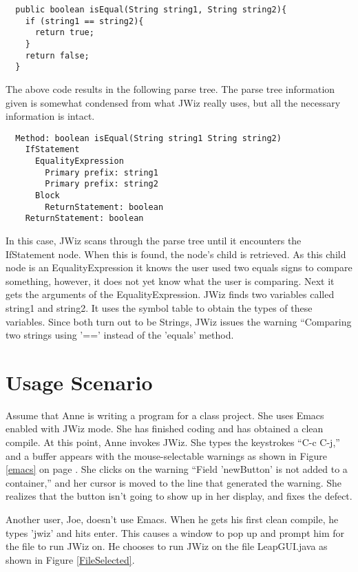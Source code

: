\begin{verbatim}
  public boolean isEqual(String string1, String string2){
    if (string1 == string2){
      return true;
    }
    return false;
  }
\end{verbatim}

The above code results in the following parse tree.  The parse tree
information given is somewhat condensed from what JWiz really uses, but all 
the necessary information is intact.

\begin{verbatim}
  Method: boolean isEqual(String string1 String string2)
    IfStatement
      EqualityExpression
        Primary prefix: string1
        Primary prefix: string2
      Block
        ReturnStatement: boolean
    ReturnStatement: boolean
\end{verbatim}

In this case, JWiz scans through the parse tree until it encounters the
IfStatement node.  When this is found, the node's child is retrieved.  As
this child node is an EqualityExpression it knows the user used two equals
signs to compare something, however, it does not yet know what the user is
comparing.  Next it gets the arguments of the EqualityExpression.  JWiz
finds two variables called string1 and string2.  It uses the symbol table
to obtain the types of these variables. Since both turn out to be Strings,
JWiz issues the warning ``Comparing two strings using '==' instead of the
'equals' method.

\section{Usage Scenario}
Assume that Anne is writing a program for a class project.  She uses Emacs
enabled with JWiz mode.  She has finished coding and has obtained a clean
compile.  At this point, Anne invokes JWiz.  She types the
keystrokes ``C-c C-j,'' and a buffer appears with the mouse-selectable
warnings as shown in Figure \ref{emacs} on page \pageref{emacs}.  She
clicks on the warning ``Field 'newButton' is not added to a container,''
and her cursor is moved to the line that generated the warning.  She
realizes that the button isn't going to show up in her display, and fixes
the defect.

Another user, Joe, doesn't use Emacs.  When he gets his first clean
compile, he types 'jwiz' and hits enter.  This causes a window to pop up
and prompt him for the file to run JWiz on. He chooses to run JWiz on the
file LeapGUI.java as shown in Figure \ref{FileSelected}.

